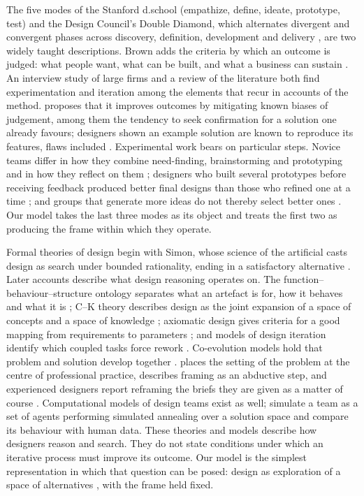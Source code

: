 \documentclass[10pt,twocolumn]{article}
\theoremstyle{definition}
\begin{document}
The five modes of the Stanford d.school (empathize, define, ideate, prototype, test) \citep{dschool2010} and the Design Council's Double Diamond, which alternates divergent and convergent phases across discovery, definition, development and delivery \citep{designcouncil2007}, are two widely taught descriptions. Brown adds the criteria by which an outcome is judged: what people want, what can be built, and what a business can sustain \citep{brown2008, brown2009}. An interview study of large firms \citep{carlgren2016} and a review of the literature \citep{micheli2019} both find experimentation and iteration among the elements that recur in accounts of the method. \citet{liedtka2015} proposes that it improves outcomes by mitigating known biases of judgement, among them the tendency to seek confirmation for a solution one already favours; designers shown an example solution are known to reproduce its features, flaws included \citep{jansson1991}. Experimental work bears on particular steps. Novice teams differ in how they combine need-finding, brainstorming and prototyping and in how they reflect on them \citep{seidel2013}; designers who built several prototypes before receiving feedback produced better final designs than those who refined one at a time \citep{dow2010}; and groups that generate more ideas do not thereby select better ones \citep{rietzschel2006}. Our model takes the last three modes as its object and treats the first two as producing the frame within which they operate.

Formal theories of design begin with Simon, whose science of the artificial \citep{simon1996} casts design as search under bounded rationality, ending in a satisfactory alternative \citep{simon1956}. Later accounts describe what design reasoning operates on. The function--behaviour--structure ontology separates what an artefact is for, how it behaves and what it is \citep{gero2004}; C--K theory describes design as the joint expansion of a space of concepts and a space of knowledge \citep{hatchuel2009}; axiomatic design gives criteria for a good mapping from requirements to parameters \citep{suh1990}; and models of design iteration identify which coupled tasks force rework \citep{smitheppinger1997}. Co-evolution models hold that problem and solution develop together \citep{maherpoon1996, dorstcross2001}. \citet{schon1983} places the setting of the problem at the centre of professional practice, \citet{dorst2011} describes framing as an abductive step, and experienced designers report reframing the briefs they are given as a matter of course \citep{paton2011}. Computational models of design teams exist as well; \citet{mccomb2015} simulate a team as a set of agents performing simulated annealing over a solution space and compare its behaviour with human data. These theories and models describe how designers reason and search. They do not state conditions under which an iterative process must improve its outcome. Our model is the simplest representation in which that question can be posed: design as exploration of a space of alternatives \citep{woodbury2006}, with the frame held fixed.
\end{document}
